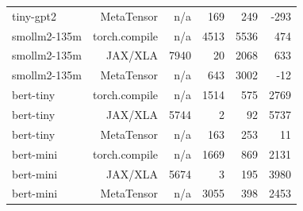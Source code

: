 \begin{tabular}{lrrrrr}
tiny-gpt2 & MetaTensor & n/a & 169 & 249 & -293 \\
smollm2-135m & torch.compile & n/a & 4513 & 5536 & 474 \\
smollm2-135m & JAX/XLA & 7940 & 20 & 2068 & 633 \\
smollm2-135m & MetaTensor & n/a & 643 & 3002 & -12 \\
bert-tiny & torch.compile & n/a & 1514 & 575 & 2769 \\
bert-tiny & JAX/XLA & 5744 & 2 & 92 & 5737 \\
bert-tiny & MetaTensor & n/a & 163 & 253 & 11 \\
bert-mini & torch.compile & n/a & 1669 & 869 & 2131 \\
bert-mini & JAX/XLA & 5674 & 3 & 195 & 3980 \\
bert-mini & MetaTensor & n/a & 3055 & 398 & 2453 \\
\bottomrule
\end{tabular}
